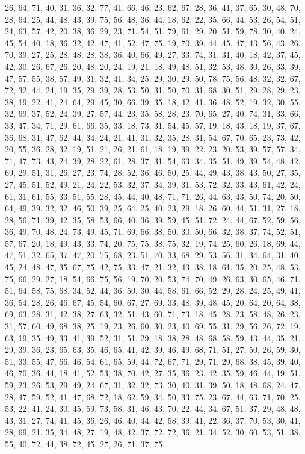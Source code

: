 \documentclass[
]{article}
\begin{document}
\begin{Schunk}
\begin{Soutput}
26, 64, 71, 40, 31, 36, 32, 77, 41, 66, 46, 23, 62, 67, 28, 36, 41, 37, 65, 30, 48, 70, 28, 64, 25, 44, 48, 43, 39, 75, 56, 48, 36, 44, 18, 62, 22, 35, 66, 44, 53, 26, 54, 51, 24, 63, 57, 42, 20, 38, 36, 29, 23, 71, 54, 51, 79, 61, 29, 20, 51, 59, 78, 30, 40, 24, 45, 54, 40, 18, 36, 32, 42, 47, 41, 52, 47, 75, 19, 70, 39, 44, 45, 47, 43, 56, 43, 26, 70, 39, 27, 25, 28, 48, 28, 38, 36, 40, 66, 49, 27, 33, 74, 31, 31, 40, 18, 42, 37, 45, 42, 30, 26, 67, 26, 20, 48, 20, 24, 19, 21, 18, 49, 48, 51, 32, 53, 48, 30, 26, 33, 39, 47, 57, 55, 38, 57, 49, 31, 32, 41, 34, 25, 29, 30, 29, 50, 78, 75, 56, 48, 32, 32, 67, 72, 32, 44, 24, 19, 35, 29, 39, 28, 53, 50, 31, 50, 70, 31, 68, 30, 51, 29, 28, 29, 23, 38, 19, 22, 41, 24, 64, 29, 45, 30, 66, 39, 35, 18, 42, 41, 36, 48, 52, 19, 32, 30, 55, 32, 69, 37, 52, 24, 39, 27, 57, 44, 23, 35, 58, 28, 23, 70, 65, 27, 40, 74, 31, 33, 66, 33, 47, 34, 71, 29, 61, 66, 35, 33, 18, 73, 31, 54, 45, 57, 19, 18, 43, 18, 19, 37, 67, 36, 68, 31, 47, 62, 44, 34, 24, 21, 41, 31, 32, 35, 28, 31, 54, 67, 70, 65, 23, 73, 42, 20, 55, 36, 28, 32, 19, 51, 21, 26, 21, 61, 18, 19, 39, 22, 23, 20, 53, 39, 57, 57, 34, 71, 47, 73, 43, 24, 39, 28, 22, 61, 28, 37, 31, 54, 63, 34, 35, 51, 49, 39, 54, 48, 42, 69, 29, 51, 31, 26, 27, 23, 74, 28, 52, 36, 46, 50, 25, 44, 49, 43, 38, 43, 50, 27, 35, 27, 45, 51, 52, 49, 21, 24, 22, 53, 32, 37, 34, 39, 31, 53, 72, 32, 33, 43, 61, 42, 24, 61, 31, 61, 55, 33, 51, 55, 28, 45, 44, 40, 48, 71, 71, 26, 44, 63, 43, 50, 74, 20, 50, 64, 49, 39, 32, 32, 46, 50, 39, 25, 64, 25, 40, 23, 29, 18, 26, 60, 44, 51, 31, 27, 18, 28, 56, 71, 39, 42, 35, 58, 53, 66, 40, 36, 39, 59, 45, 51, 72, 24, 44, 67, 52, 59, 56, 36, 49, 70, 48, 24, 73, 49, 45, 71, 69, 66, 38, 50, 30, 50, 66, 32, 38, 37, 74, 52, 51, 57, 67, 20, 18, 49, 43, 33, 74, 20, 75, 75, 38, 75, 32, 19, 74, 25, 60, 26, 18, 69, 44, 47, 51, 32, 65, 37, 47, 20, 75, 68, 23, 51, 70, 33, 68, 29, 53, 56, 31, 34, 64, 31, 40, 45, 24, 48, 47, 35, 67, 75, 42, 75, 33, 47, 21, 32, 43, 38, 18, 61, 35, 20, 25, 48, 53, 75, 66, 29, 27, 18, 54, 66, 75, 56, 19, 70, 20, 53, 74, 70, 49, 26, 63, 30, 65, 46, 71, 51, 64, 58, 75, 68, 34, 52, 44, 36, 50, 30, 44, 58, 61, 66, 52, 29, 28, 24, 25, 49, 41, 36, 54, 28, 26, 46, 67, 45, 54, 60, 67, 27, 69, 33, 48, 39, 48, 45, 20, 64, 20, 64, 38, 69, 63, 28, 31, 42, 38, 27, 63, 32, 51, 43, 60, 71, 73, 18, 45, 28, 23, 58, 48, 26, 23, 31, 57, 60, 49, 68, 38, 25, 19, 23, 26, 60, 30, 23, 40, 69, 55, 31, 29, 56, 26, 72, 19, 63, 19, 35, 49, 33, 41, 39, 52, 31, 51, 29, 18, 38, 28, 48, 68, 58, 59, 43, 44, 35, 21, 29, 39, 36, 23, 65, 63, 35, 46, 65, 41, 42, 39, 46, 49, 68, 71, 51, 27, 50, 26, 59, 30, 51, 33, 55, 47, 66, 46, 54, 61, 65, 59, 44, 72, 67, 71, 29, 71, 29, 68, 38, 45, 39, 40, 46, 70, 36, 44, 18, 41, 52, 53, 38, 70, 42, 27, 35, 36, 23, 42, 35, 59, 46, 44, 19, 51, 59, 23, 26, 53, 29, 49, 24, 67, 31, 32, 32, 73, 30, 40, 31, 39, 50, 18, 48, 68, 24, 47, 28, 47, 59, 52, 41, 47, 68, 72, 18, 62, 59, 34, 50, 33, 75, 23, 67, 44, 63, 71, 70, 25, 53, 22, 41, 24, 30, 45, 59, 73, 58, 31, 46, 43, 70, 22, 44, 34, 67, 51, 37, 29, 48, 48, 43, 31, 27, 74, 41, 45, 36, 26, 46, 40, 44, 42, 58, 39, 41, 22, 36, 37, 70, 53, 30, 41, 28, 69, 21, 35, 34, 48, 27, 19, 48, 42, 37, 72, 72, 36, 21, 34, 52, 30, 60, 53, 51, 38, 55, 40, 72, 44, 38, 72, 45, 27, 26, 71, 37, 75, 
\end{Soutput}
\end{Schunk}
\end{document}

